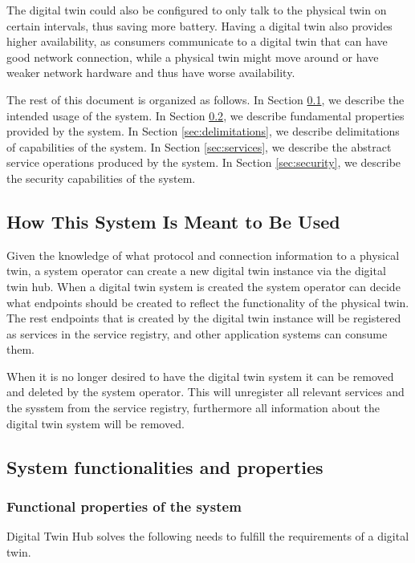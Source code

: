 \documentclass[a4paper]{arrowhead}
\begin{document}
The digital twin could also be configured to only talk to the physical twin on certain intervals, thus saving more battery. Having a digital twin also provides higher availability, as consumers communicate to a digital twin that can have good network connection, while a physical twin might move around or have weaker network hardware and thus have worse availability.

The rest of this document is organized as follows.
In Section \ref{sec:use}, we describe the intended usage of the system.
In Section \ref{sec:properties}, we describe fundamental properties
provided by the system.
In Section \ref{sec:delimitations}, we describe delimitations of capabilities
of the system.
In Section \ref{sec:services}, we describe the abstract service
operations produced by the system.
In Section \ref{sec:security}, we describe the security capabilities
of the system.

\subsection{How This System Is Meant to Be Used}
\label{sec:use}

Given the knowledge of what protocol and connection information to a physical twin, a system operator can create a new digital twin instance via the digital twin hub. When a digital twin system is created the system operator can decide what endpoints should be created to reflect the functionality of the physical twin. The rest endpoints that is created by the digital twin instance will be registered as services in the service registry, and other application systems can consume them.

When it is no longer desired to have the digital twin system it can be removed and deleted by the system operator. This will unregister all relevant services and the sysstem from the service registry, furthermore all information about the digital twin system will be removed. 

\subsection{System functionalities and properties}
\label{sec:properties}

\subsubsection {Functional properties of the system}
Digital Twin Hub solves the following needs to fulfill the requirements of a digital twin.
\end{document}
